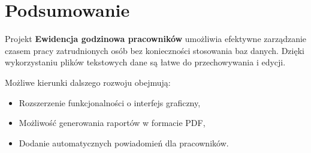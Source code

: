 \chapter{Podsumowanie}
Projekt \textbf{Ewidencja godzinowa pracowników} umożliwia efektywne zarządzanie czasem pracy zatrudnionych osób bez konieczności stosowania baz danych. Dzięki wykorzystaniu plików tekstowych dane są łatwe do przechowywania i edycji.

\noindent Możliwe kierunki dalszego rozwoju obejmują:
\begin{itemize}
    \item Rozszerzenie funkcjonalności o interfejs graficzny,
    \item Możliwość generowania raportów w formacie PDF,
    \item Dodanie automatycznych powiadomień dla pracowników.
\end{itemize}